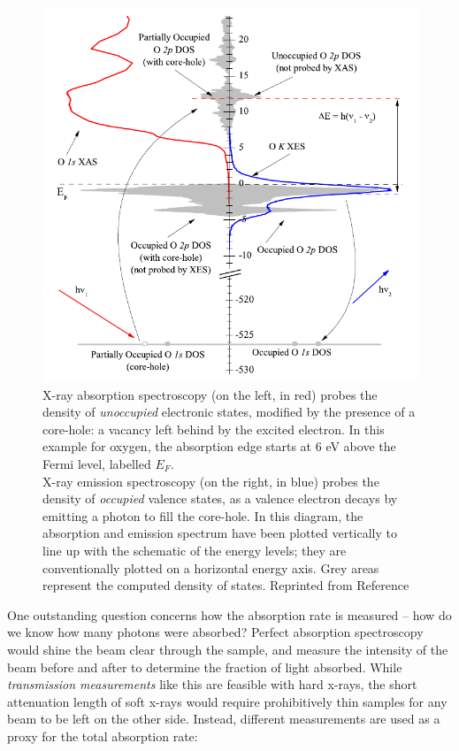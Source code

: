 \begin{figure}[htb] %
   \centering
   \includegraphics[scale=0.8]{../data/Chapter1/1i_sxsProcesses/1i.pdf} 
   \caption[X-ray absorption spectroscopy probes the density of \emph{unoccupied} electronic states, modified by the presence of a core-hole: a vacancy left behind by the excited electron.]{X-ray absorption spectroscopy (on the left, in red) probes the density of \emph{unoccupied} electronic states, modified by the presence of a core-hole: a vacancy left behind by the excited electron.  In this example for oxygen, the absorption edge starts at 6 eV above the Fermi level, labelled $E_F$.\\X-ray emission spectroscopy (on the right, in blue) probes the density of \emph{occupied} valence states, as a valence electron decays by emitting a photon to fill the core-hole.  In this diagram, the absorption and emission spectrum have been plotted vertically to line up with the schematic of the energy levels; they are conventionally plotted on a horizontal energy axis.  Grey areas represent the computed density of states.  Reprinted from Reference \cite{McL10}}
   \label{1i}
\end{figure}

One outstanding question concerns how the absorption rate is measured -- how do we know how many photons were absorbed?  Perfect absorption spectroscopy would shine the beam clear through the sample, and measure the intensity of the beam before and after to determine the fraction of light absorbed.  While \emph{transmission measurements} like this are feasible with hard x-rays, the short attenuation length of soft x-rays would require prohibitively thin samples for any beam to be left on the other side.  Instead, different measurements are used as a proxy for the total absorption rate:
